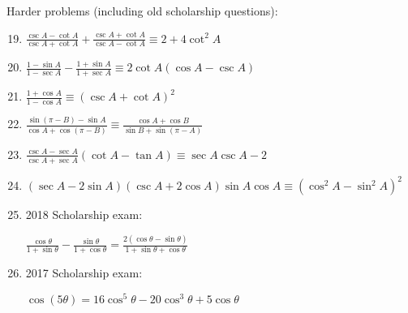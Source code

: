 \documentclass[../main.tex]{subfiles}
\begin{document}
Harder problems (including old scholarship questions):
\begin{enumerate}
    \setcounter{enumi}{18}
    \item $\frac{\csc{A}-\cot{A}}{\csc{A}+\cot{A}}+\frac{\csc{A}+\cot{A}}{\csc{A}-\cot{A}}\equiv 2+4\cot^2{A}$
    
    \item $\frac{1-\sin{A}}{1-\sec{A}}-\frac{1+\sin{A}}{1+\sec{A}}\equiv 2\cot{A}(\cos{A}-\csc{A})$
    
    \item $\frac{1+\cos{A}}{1-\cos{A}}\equiv (\csc{A}+\cot{A})^2$
    
    \item $\frac{\sin{(\pi-B)}-\sin{A}}{\cos{A}+\cos{(\pi - B)}}\equiv \frac{\cos{A}+\cos{B}}{\sin{B}+\sin{(\pi - A)}}$
    
    \item $\frac{\csc{A}-\sec{A}}{\csc{A}+\sec{A}}(\cot{A}-\tan{A})\equiv \sec{A}\csc{A}-2$
    
    \item $(\sec{A}-2\sin{A})(\csc{A}+2\cos{A})\sin{A}\cos{A}\equiv (\cos^2{A}-\sin^2{A})^2$
    
    \item 2018 Scholarship exam:
    
    $\frac{\cos{\theta}}{1+\sin{\theta}}-\frac{\sin{\theta}}{1+\cos{\theta}}=\frac{2(\cos{\theta}-\sin{\theta})}{1+\sin{\theta}+\cos{\theta}}$

    \item 2017 Scholarship exam:
    
    $\cos{(5\theta)}=16\cos^5{\theta}-20\cos^3{\theta}+5\cos{\theta}$
    
\end{enumerate}
\end{document}
